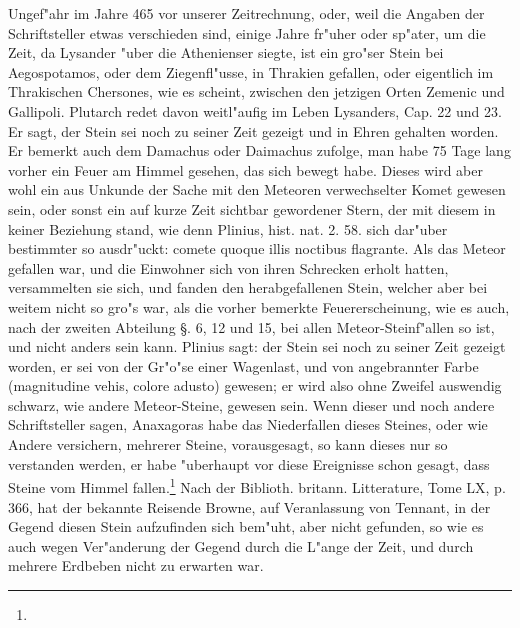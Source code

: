 \documentclass[a4paper, 11pt, oneside, polutonikogreek, german]{article}
\begin{document}
Ungef"ahr im Jahre 465 vor unserer Zeitrechnung, oder, weil die Angaben der Schriftsteller etwas verschieden sind, einige Jahre fr"uher oder sp"ater, um die Zeit, da Lysander "uber die Athenienser siegte, ist ein gro"ser Stein bei Aegospotamos, oder dem Ziegenfl"usse, in Thrakien gefallen, oder eigentlich im Thrakischen Chersones, wie es scheint, zwischen den jetzigen Orten Zemenic und Gallipoli. Plutarch redet davon weitl"aufig im Leben Lysanders, Cap. 22 und 23. Er sagt, der Stein sei noch zu seiner Zeit gezeigt und in Ehren gehalten worden. Er bemerkt auch dem Damachus oder Daimachus zufolge, man habe 75 Tage lang vorher ein Feuer am Himmel gesehen, das sich bewegt habe. Dieses wird aber wohl ein aus Unkunde der Sache mit den Meteoren verwechselter Komet gewesen sein, oder sonst ein auf kurze Zeit sichtbar gewordener Stern, der mit diesem in keiner Beziehung stand, wie denn Plinius, hist. nat. 2. 58. sich dar"uber bestimmter so ausdr"uckt: comete quoque illis noctibus flagrante. Als das Meteor gefallen war, und die Einwohner sich von ihren Schrecken erholt hatten, versammelten sie sich, und fanden den herabgefallenen Stein, welcher aber bei weitem nicht so gro"s war, als die vorher bemerkte Feuererscheinung, wie es auch, nach der zweiten Abteilung §. 6, 12 und 15, bei allen Meteor-Steinf"allen so ist, und nicht anders sein kann. Plinius sagt: der Stein sei noch zu seiner Zeit gezeigt worden, er sei von der Gr"o"se einer Wagenlast, und von angebrannter Farbe (magnitudine vehis, colore adusto) gewesen; er wird also ohne Zweifel auswendig schwarz, wie andere Meteor-Steine, gewesen sein. Wenn dieser und noch andere Schriftsteller sagen, Anaxagoras habe das Niederfallen dieses Steines, oder wie Andere versichern, mehrerer Steine, vorausgesagt, so kann dieses nur so verstanden werden, er habe "uberhaupt vor diese Ereignisse schon gesagt, dass Steine vom Himmel fallen.\footnote{} Nach der Biblioth. britann. Litterature, Tome LX, p. 366, hat der bekannte Reisende Browne, auf Veranlassung von Tennant, in der Gegend diesen Stein aufzufinden sich bem"uht, aber nicht gefunden, so wie es auch wegen Ver"anderung der Gegend durch die L"ange der Zeit, und durch mehrere Erdbeben nicht zu erwarten war.
\end{document}
